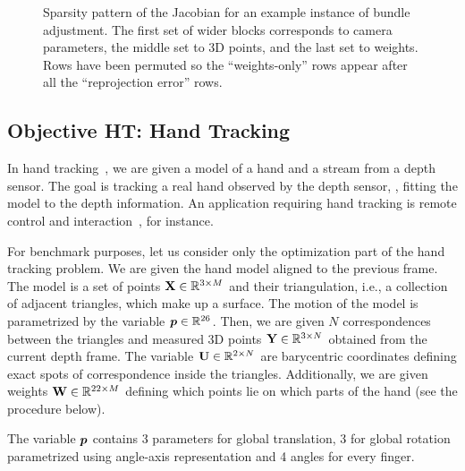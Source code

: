 \documentclass[suppldata]{article}
\begin{document}
\begin{figure}[htb]
    \centering
    \caption{Sparsity pattern of the Jacobian for an example instance of bundle adjustment. The first set of wider blocks corresponds to camera parameters, the middle set to 3D points, and the last set to weights.  Rows have been permuted so the ``weights-only'' rows appear after all the ``reprojection error'' rows.}
    \label{fig:ba-jacobian}
\end{figure}

\subsection{Objective HT: Hand Tracking}
In hand tracking~\cite{Taylor14hand}, we are given a model of a hand and a stream from a depth sensor. The goal is tracking a real hand observed by the depth sensor, \ie, fitting the model to the depth information. An application requiring hand tracking is remote control and interaction~\cite{Wood16hands}, for instance.

For benchmark purposes, let us consider only the optimization part of the hand tracking problem. We are given the hand model aligned to the previous frame. The model is a set of points ${\bf X} \in {\mathbb R}^{3 \times M}$ and their triangulation, i.e., a collection of adjacent triangles, which make up a surface. The motion of the model is parametrized by the variable $\bm{p} \in {\mathbb R}^{26}$. Then, we are given $N$ correspondences between the triangles and measured 3D points ${\bf Y} \in {\mathbb R}^{3 \times N}$ obtained from the current depth frame. The variable ${\bf U} \in {\mathbb R}^{2 \times N}$ are barycentric coordinates defining exact spots of correspondence inside the triangles. Additionally, we are given weights ${\bf W} \in {\mathbb R}^{22 \times M}$ defining which points lie on which parts of the hand (see the procedure below).

The variable $\bm{p}$ contains 3 parameters for global translation, 3 for global rotation parametrized using angle-axis representation and 4 angles for every finger.
\end{document}
